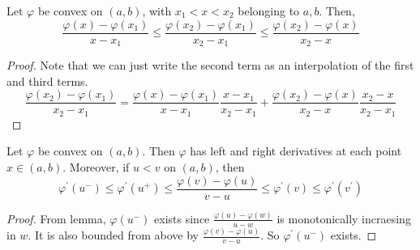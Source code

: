   \begin{lemma}
    Let $\varphi$ be convex on $(a, b)$, with $x_1 < x < x_2$ belonging to $a, b$. Then, 
    \begin{equation}
      \frac{\varphi(x) - \varphi(x_1)}{x - x_1} \leq \frac{\varphi(x_2) - \varphi(x_1)}{x_2 - x_1} \leq \frac{\varphi(x_2) - \varphi(x)}{x_2 - x} 
    \end{equation}
  \end{lemma}
  \begin{proof}
    Note that we can just write the second term as an interpolation of the first and third terms. 
    \begin{equation}
      \frac{\varphi(x_2) - \varphi(x_1)}{x_2 - x_1} = \frac{\varphi(x) - \varphi(x_1)}{x - x_1} \frac{x - x_1}{x_2 - x_1} + \frac{\varphi(x_2) - \varphi(x)}{x_2 - x} \frac{x_2 - x}{x_2 - x_1}
    \end{equation}
  \end{proof}

  \begin{theorem}
    Let $\varphi$ be convex on $(a, b)$. Then $\varphi$ has left and right derivatives at each point $x \in (a, b)$. Moreover, if $u < v$ on $(a, b)$, then 
    \begin{equation}
      \varphi^\prime (u^-) \leq \varphi^\prime (u^+) \leq \frac{\varphi(v) - \varphi(u)}{v - u} \leq \varphi^\prime (v) \leq \varphi^\prime (v^\prime)
    \end{equation}
  \end{theorem}
  \begin{proof}
    From lemma, $\varphi(u^-)$ exists since $\frac{\varphi(u) - \varphi(w)}{u - w}$ is monotonically incraesing in $w$. It is also bounded from above by $\frac{\varphi(v) - \varphi(u)}{v - u}$. So $\varphi^\prime(u^-)$ exists. 
  \end{proof}


